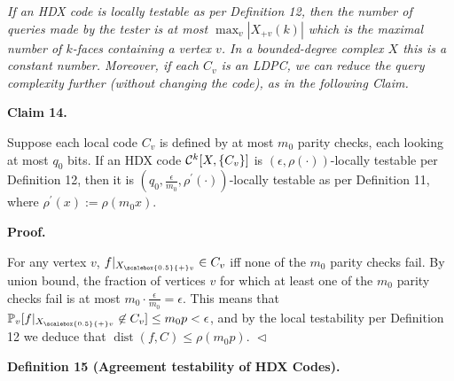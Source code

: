 \documentclass[10pt,a4paper]{article}
\begin{document}
\emph{If an HDX code is locally testable as per Definition 12, then the number of queries made by the tester is at most $\max_{v}|X_{+v}(k)|$ which is the maximal number of $k$-faces containing a vertex $v$. In a bounded-degree complex $X$ this is a constant number.
Moreover, if each $C_{v}$ is an LDPC, we can reduce the query complexity further (without changing the code), as in the following Claim.}\par







\par\medskip\noindent\textbf{
Claim 14. 
}\par



Suppose each local code $C_{v}$ is defined by at most $m_{0}$ parity checks, each looking at most $q_{0}$ bits. If an HDX code ${\cal C}^{k}[X,\{C_{v}\}]$ is $(\epsilon,\rho(\cdot))$-locally testable per Definition 12, then it is $(q_{0},\frac{\epsilon}{m_{0}},\rho^{\prime}(\cdot))$-locally testable as per Definition 11, where $\rho^{\prime}(x):=\rho(m_{0}x)$.\par






\par\medskip\noindent\textbf{
\textbf{Proof}.}\par




For any vertex $v$, $f|_{{X}_{\scalebox{0.5}{+}v}}\in C_{v}$ iff none of the $m_{0}$ parity checks fail. By union bound, the fraction of vertices $v$ for which at least one of the $m_{0}$ parity checks fail is at most $m_{0}\cdot\frac{\epsilon}{m_{0}}=\epsilon$. This means that $\operatorname*{\mathbb{P}}_{v}[f|_{{X}_{\scalebox{0.5}{+}v}}\not\in C_{v}]\leq
m_{0}p<\epsilon$, and by the local testability per Definition 12 we deduce that $\operatorname{dist}(f,C)\leq\rho(m_{0}p)$.
$\vartriangleleft$\par





\par\medskip\noindent\textbf{
\textbf{Definition 15}\textbf{ }(Agreement testability of HDX Codes)\textbf{.}
}\par
\end{document}
